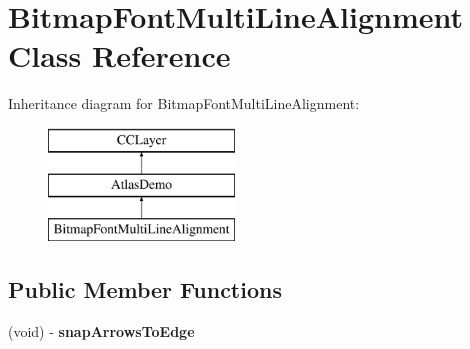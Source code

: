 \hypertarget{interface_bitmap_font_multi_line_alignment}{\section{Bitmap\-Font\-Multi\-Line\-Alignment Class Reference}
\label{interface_bitmap_font_multi_line_alignment}
}
Inheritance diagram for Bitmap\-Font\-Multi\-Line\-Alignment\-:\begin{figure}[H]
\begin{center}
\leavevmode
\includegraphics[height=3.000000cm]{interface_bitmap_font_multi_line_alignment}
\end{center}
\end{figure}
\subsection*{Public Member Functions}
\begin{DoxyCompactItemize}
\item 
\hypertarget{interface_bitmap_font_multi_line_alignment_a3e0cfd6c473b3837b07231eeaa73cf42}{(void) -\/ {\bfseries snap\-Arrows\-To\-Edge}}\label{interface_bitmap_font_multi_line_alignment_a3e0cfd6c473b3837b07231eeaa73cf42}

\end{DoxyCompactItemize}
